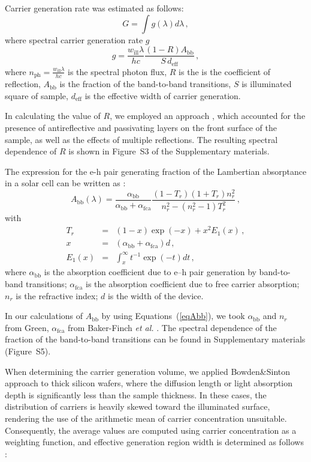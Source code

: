 \documentclass{WileyMSP-template}
\begin{document}
Carrier generation rate was estimated as follows:
\begin{equation}
\label{eqGint}
G=\int g(\lambda) d\lambda\,,
\end{equation}
where spectral carrier generation rate $g$
\begin{equation}
\label{eqGint}
g=\frac{w_\mathrm{ill}\lambda}{hc}\frac{(1-R)A_\mathrm{bb}}{S\,d_\mathrm{eff}}\,,
\end{equation}
where $n_\mathrm{ph}=\frac{w_\mathrm{ill}\lambda}{hc}$ is the spectral photon flux,
$R$ is the is the coefficient of reflection,
$A_\mathrm{bb}$ is the fraction of the band-to-band transitions,
$S$ is illuminated square of sample,
$d_\mathrm{eff}$ is the effective width of carrier generation.

In calculating the value of $R$, we employed an approach \cite{KostRefl2000},
which accounted for the presence of antireflective and passivating layers on the front surface of the sample,
as well as the effects of multiple reflections.
The resulting spectral dependence of $R$ is shown in Figure~S3 of the Supplementary materials.

The expression for the e-h pair generating fraction of the Lambertian absorptance in a solar cell
can be written as \cite{Schaefer2018}:
\begin{equation}
\label{eqAbb}
A_\mathrm{bb}(\lambda)=\frac{\alpha_\mathrm{bb}}{\alpha_\mathrm{bb}+\alpha_\mathrm{fca}}\frac{(1-T_r)(1+T_r)n_r^2}{n_r^2-(n_r^2-1)T_r^2}\,,
\end{equation}
with
\begin{eqnarray*}
T_r&=&(1-x)\exp(-x)+x^2E_1(x)\,,\\
x&=&(\alpha_\mathrm{bb}+\alpha_\mathrm{fca})d\,,\\
E_1(x)&=&\int_x^\infty t^{-1}\exp(-t)dt\,,
\end{eqnarray*}
where
$\alpha_\mathrm{bb}$ is the absorption coefficient due to e–h pair
generation by band-to-band transitions;
$\alpha_\mathrm{fca}$ is the absorption coefficient due to free carrier absorption;
$n_r$ is the refractive index;
$d$ is the width of the device.

In our calculations of $A_\mathrm{bb}$ by using Equations~(\ref{eqAbb}), we took  $\alpha_\mathrm{bb}$ and 
$n_r$ from Green\cite{Green2022}, $\alpha_\mathrm{fca}$  from Baker-Finch \emph{et al.} \cite{SiFCA}.
The spectral dependence of the fraction of the band-to-band transitions can be found in Supplementary materials (Figure~S5). 

When determining the carrier generation volume, we applied Bowden\&Sinton  approach \cite{Bowden2007} to thick silicon wafers, 
where the diffusion length or light absorption depth is significantly less than the sample thickness. 
In these cases, the distribution of carriers is heavily skewed toward the illuminated surface, 
rendering the use of the arithmetic mean of carrier concentration unsuitable. 
Consequently, the average values are computed using carrier concentration as a weighting function, 
and effective generation region width is determined as follows \cite{Bowden2007}:
\end{document}
